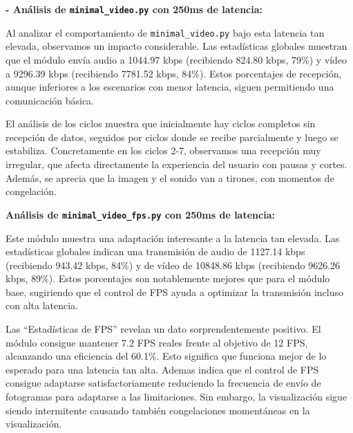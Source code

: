 \vspace{\baselineskip}

\textbf{- Análisis de \texttt{minimal\_video.py} con 250ms de latencia:}
\vspace{\baselineskip}

Al analizar el comportamiento de \texttt{minimal\_video.py} bajo esta latencia tan elevada, observamos un impacto considerable. Las estadísticas globales muestran que el módulo envía audio a 1044.97 kbps (recibiendo 824.80 kbps, 79\%) y vídeo a 9296.39 kbps (recibiendo 7781.52 kbps, 84\%). Estos porcentajes de recepción, aunque inferiores a los escenarios con menor latencia, siguen permitiendo una comunicación básica.
\vspace{\baselineskip}

El análisis de los ciclos muestra que inicialmente hay ciclos completos sin recepción de datos, seguidos por ciclos donde se recibe parcialmente y luego se estabiliza. Concretamente en los ciclos 2-7, observamos una recepción muy irregular, que afecta directamente la experiencia del usuario con pausas y cortes. Además, se aprecia que la imagen y el sonido van a tirones, con momentos de congelación.

\vspace{\baselineskip}

\textbf{Análisis de \texttt{minimal\_video\_fps.py} con 250ms de latencia:}
\vspace{\baselineskip}

Este módulo muestra una adaptación interesante a la latencia tan elevada. Las estadísticas globales indican una transmisión de audio de 1127.14 kbps (recibiendo 943.42 kbps, 84\%) y de vídeo de 10848.86 kbps (recibiendo 9626.26 kbps, 89\%). Estos porcentajes son notablemente mejores que para el módulo base, sugiriendo que el control de FPS ayuda a optimizar la transmisión incluso con alta latencia.
\vspace{\baselineskip}

Las ``Estadísticas de FPS'' revelan un dato sorprendentemente positivo. El módulo consigue mantener 7.2 FPS reales frente al objetivo de 12 FPS, alcanzando una eficiencia del 60.1\%. Esto significa que funciona mejor de lo esperado para una latencia tan alta. Ademas indica que el control de FPS consigue adaptarse satisfactoriamente reduciendo la frecuencia de envío de fotogramas para adaptarse a las limitaciones. Sin embargo, la visualización sigue siendo intermitente causando también congelaciones momentáneas en la visualización.

